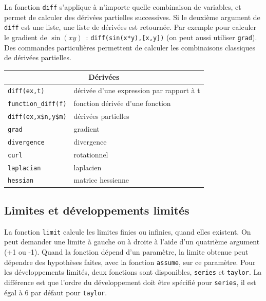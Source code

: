 \documentclass{article}
\begin{document}
\begin{giacjshere}
La fonction \verb|diff| s'applique \`a n'importe quelle combinaison de
variables, et permet de calculer des d\'eriv\'ees partielles
successives.
Si le deuxi\`eme argument de \verb|diff| est une liste, une
liste de d\'eriv\'ees est retourn\'ee. Par exemple pour calculer
le gradient de $\sin(xy)$~:
\verb|diff(sin(x*y),[x,y])| (on peut aussi utiliser \verb|grad|). 
Des commandes particuli\`eres permettent de calculer les  
combinaisons classiques de d\'eriv\'ees partielles.

\begin{center}
\begin{tabular}{|ll|}
\hline
\multicolumn{2}{|c|}{\bf D\'eriv\'ees}\\
\hline\hline
\verb|diff(ex,t)| &d\'eriv\'ee d'une expression par rapport \`a t\\
\verb|function_diff(f)| & fonction d\'eriv\'ee d'une fonction\\
\verb|diff(ex,x$n,y$m)| & d\'eriv\'ees partielles\\
\verb|grad| & gradient\\ 
\verb|divergence| & divergence\\
\verb|curl| & rotationnel\\
\verb|laplacian| & laplacien\\
\verb|hessian| & matrice hessienne\\
\hline
\end{tabular}
\end{center}
%
\subsection{Limites et d\'eveloppements limit\'es}
%
La fonction  \verb|limit| calcule les limites finies ou
infinies, quand elles existent. On peut demander une limite 
\`a gauche ou \`a droite \`a l'aide d'un quatri\`eme argument (+1 ou -1). 
Quand la fonction d\'epend d'un
param\`etre, la limite obtenue peut d\'ependre des hypoth\`eses
faites, avec la fonction {\tt assume}, sur ce param\`etre. 
Pour les d\'eveloppements limit\'es,
deux fonctions sont disponibles, \verb|series| et \verb|taylor|. La
diff\'erence est que l'ordre du d\'eveloppement doit \^etre
sp\'ecifi\'e pour \verb|series|, il est \'egal \`a 6 par d\'efaut
pour \verb|taylor|. 


\end{giacjshere}
\end{document}
